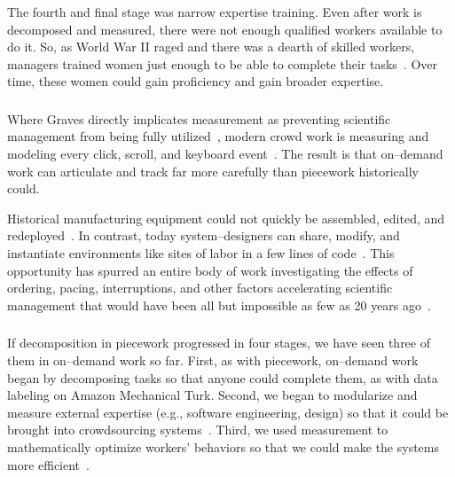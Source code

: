 \documentclass[pn4226]{subfiles}
\begin{document}
The fourth and final stage was narrow expertise training. 
Even after work is decomposed and measured, there were not enough qualified workers available to do it. 
So, as World War II raged and there was a dearth of skilled workers, managers trained women just enough to be able to complete their tasks~\cite{hart2013rise}. 
Over time, these women could gain proficiency and gain broader expertise.



\subsubsection{\whatchanged}
\begin{comment}
outline
	- measurement is more precise,
  so decomposition is deeper
	- not a single position,
  but a marketplace
\end{comment}

Where Graves directly implicates measurement as
preventing scientific management from being fully utilized~\cite{10.2307/23702539},
modern crowd work is measuring and modeling every click,
scroll,
and keyboard event~\cite{rzeszotarski2011instrumenting,rzeszotarski2012crowdscape}.
The result is that on--demand work can articulate and track far more carefully than piecework historically could.


Historical manufacturing equipment could not quickly be assembled,
edited,
and redeployed~\cite{hu1961parallel}.
In contrast,
today system--designers can share,
modify,
and instantiate environments
like sites of labor in a few lines of code~\cite{lessig2006code,turkitLittle}.
This opportunity has spurred an entire body of work investigating the effects of
ordering,
pacing,
interruptions,
and
other factors accelerating scientific management that would have been
all but impossible as few as 20 years ago~\cite{dai2015and,Cai:2016:CRI:2858036.2858237,cheng2015break,measuringCrowdsourcingCheng,embracingErrorKrishna}.


\subsubsection{\implication}
If decomposition in piecework progressed in four stages, we have seen three of them in on--demand work so far.
First, as with piecework, on--demand work began by decomposing tasks so that anyone could complete them, as with data labeling on Amazon Mechanical Turk.
Second, we began to modularize and measure external expertise (e.g., software engineering, design) so that it could be brought into crowdsourcing systems~\cite{foundry,Chen2016}.
Third, we used measurement to mathematically optimize workers' behaviors so that we could make the systems more efficient~\cite{weld2010decision}.
\end{document}
